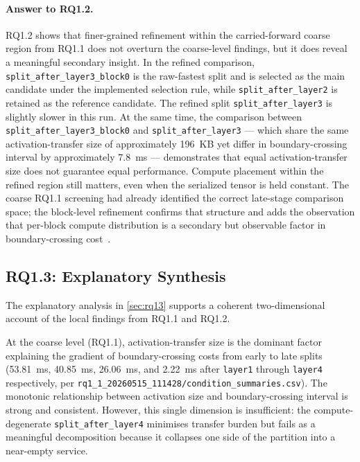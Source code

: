 \paragraph{Answer to RQ1.2.}
RQ1.2 shows that finer-grained refinement within the carried-forward coarse
region from RQ1.1 does not overturn the coarse-level findings, but it does
reveal a meaningful secondary insight. In the refined comparison,
\texttt{split\_after\_layer3\_block0} is the raw-fastest split and is selected
as the main candidate under the implemented selection rule, while
\texttt{split\_after\_layer2} is retained as the reference candidate. The
refined split \texttt{split\_after\_layer3} is slightly slower in this run.
At the same time, the comparison between \texttt{split\_after\_layer3\_block0}
and \texttt{split\_after\_layer3} --- which share the same activation-transfer
size of approximately 196~KB yet differ in boundary-crossing interval by
approximately 7.8~ms --- demonstrates that equal activation-transfer size does
not guarantee equal performance. Compute placement within the refined region
still matters, even when the serialized tensor is held constant. The coarse RQ1.1
screening had already identified the correct late-stage comparison space; the
block-level refinement confirms that structure and adds the observation that
per-block compute distribution is a secondary but observable factor in
boundary-crossing cost~\cite{dnnsplit, deeperthings, survey_partitioning,
fine_grained_partitioning, hierarchical_partitioning, neurosurgeon, bottlefit}.
\subsection{RQ1.3: Explanatory Synthesis}
\label{sec:analysis-rq13}

The explanatory analysis in \cref{sec:rq13} supports a coherent two-dimensional
account of the local findings from RQ1.1 and RQ1.2.

At the coarse level (RQ1.1), activation-transfer size is the dominant factor
explaining the gradient of boundary-crossing costs from early to late splits
(53.81~ms, 40.85~ms, 26.06~ms, and 2.22~ms after \texttt{layer1} through
\texttt{layer4} respectively, per
\texttt{rq1\_1\_20260515\_111428/condition\_summaries.csv}). The monotonic
relationship between activation size and boundary-crossing interval is strong
and consistent. However, this single dimension is insufficient: the
compute-degenerate \texttt{split\_after\_layer4} minimises transfer burden but
fails as a meaningful decomposition because it collapses one side of the
partition into a near-empty service.

